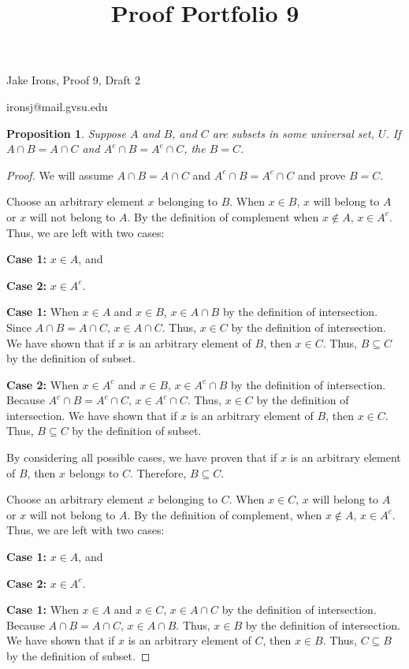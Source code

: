 \documentclass[11 pt]{article}
\title{Proof Portfolio 9}
\newtheorem{proposition}{Proposition}
\newcommand{\newpar}{\vspace{.15in}\noindent}
\begin{document}
\noindent Jake Irons, Proof 9, Draft 2

\noindent ironsj@mail.gvsu.edu

\newpar
\begin{proposition}
Suppose $A$ and $B$, and $C$ are subsets in some universal set, $U$. If $A\cap B=A\cap C$ and $A^c\cap B=A^c\cap C$, the $B=C$.
\end{proposition}
\begin{proof}
\newpar 
We will assume $A\cap B=A\cap C$ and $A^c\cap B=A^c\cap C$ and prove $B=C$.

\newpar
Choose an arbitrary element $x$ belonging to $B$. When $x\in B$, $x$ will belong to $A$ or $x$ will not belong to $A$. By the definition of complement when $x\not\in A$, $x\in A^c$. Thus, we are left with two cases:

\textbf{Case 1:} $x\in A$, and

\textbf{Case 2:} $x\in A^c$.

\newpar 
\textbf{Case 1:} When $x\in A$ and $x\in B$, $x\in A\cap B$ by the definition of intersection. Since $A\cap B=A\cap C$, $x\in A\cap C$. Thus, $x\in C$ by the definition of intersection. We have shown that if $x$ is an arbitrary element of $B$, then $x\in C$. Thus, $B\subseteq C$ by the definition of subset.

\newpar 
\textbf{Case 2:} When $x\in A^c$ and $x\in B$, $x\in A^c\cap B$ by the definition of intersection. Because $A^c\cap B=A^c\cap C$, $x\in A^c\cap C$. Thus, $x\in C$ by the definition of intersection. We have shown that if $x$ is an arbitrary element of $B$, then $x\in C$. Thus, $B\subseteq C$ by the definition of subset.

\newpar By considering all possible cases, we have proven that if $x$ is an arbitrary element of $B$, then $x$ belongs to $C$. Therefore, $B\subseteq C$.

\newpar
Choose an arbitrary element $x$ belonging to $C$. When $x\in C$, $x$ will belong to $A$ or $x$ will not belong to $A$. By the definition of complement, when $x\not\in A$, $x\in A^c$. Thus, we are left with two cases:

\textbf{Case 1:} $x\in A$, and

\textbf{Case 2:} $x\in A^c$.

\newpar 
\textbf{Case 1:} When $x\in A$ and $x\in C$, $x\in A\cap C$ by the definition of intersection. Because $A\cap B=A\cap C$, $x\in A\cap B$. Thus, $x\in B$ by the definition of intersection. We have shown that if $x$ is an arbitrary element of $C$, then $x\in B$. Thus, $C\subseteq B$ by the definition of subset.


\end{proof}
\end{document}
